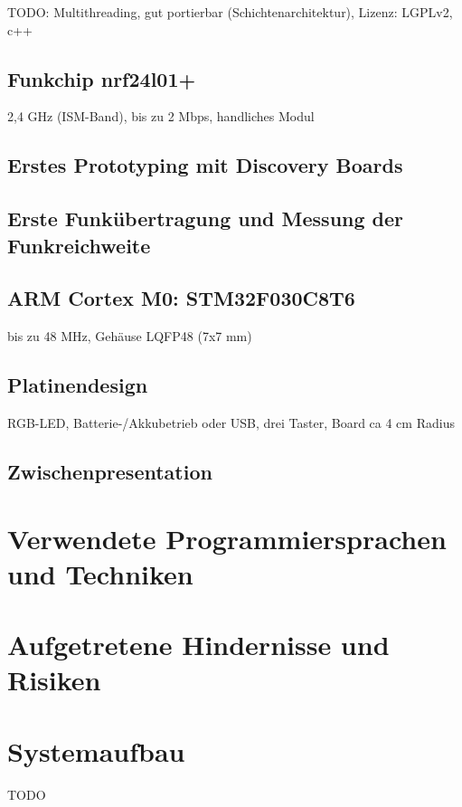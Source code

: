 \documentclass{IEEEtran}
\begin{document}
        TODO: Multithreading, gut portierbar (Schichtenarchitektur), Lizenz: LGPLv2, c++

    \subsection{Funkchip nrf24l01+}

        2,4 GHz (ISM-Band), bis zu 2 Mbps, handliches Modul

    \subsection{Erstes Prototyping mit Discovery Boards}



    \subsection{Erste Funkübertragung und Messung der Funkreichweite}



    \subsection{ARM Cortex M0: STM32F030C8T6}

        bis zu 48 MHz, Gehäuse LQFP48 (7x7 mm)

    \subsection{Platinendesign}

        RGB-LED, Batterie-/Akkubetrieb oder USB, drei Taster, Board ca 4 cm Radius

    \subsection{Zwischenpresentation}
    

\section{Verwendete Programmiersprachen und Techniken}


\section{Aufgetretene Hindernisse und Risiken}

\section{Systemaufbau}
    TODO
\end{document}
